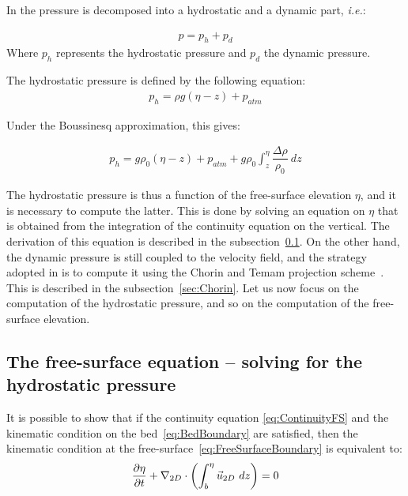 In  the pressure is decomposed into a hydrostatic and a dynamic part, \textit{i.e.}:

\begin{align}
  p=p_h+p_d
\end{align}
Where $p_h$ represents the hydrostatic pressure and $p_d$ the dynamic pressure.


The hydrostatic pressure is defined by the following equation:
\begin{align}
  p_h = \rho g (\eta-z) + p_{atm}
\end{align}

Under the Boussinesq approximation, this gives:

\begin{align}
  p_h  = g\rho_0(\eta-z) + p_{atm} + g\rho_0\int_z^\eta\dfrac{\Delta\rho}{\rho_0}~dz
\end{align}

The hydrostatic pressure is thus a function of the free-surface elevation $\eta$, and it is necessary to compute the latter.
This is done by solving an equation on $\eta$ that is obtained from the integration of the continuity equation on the vertical.
The derivation of this equation is described in the subsection~\ref{sec:FSequation}.
On the other hand, the dynamic pressure is still coupled to the velocity field, and the strategy adopted in 
is to compute it using the Chorin and Temam projection scheme~\cite{Chorin1968, Temam1968}.
This is described in the subsection~\ref{sec:Chorin}.
Let us now focus on the computation of the hydrostatic pressure, and so on the computation of the free-surface elevation.


\subsection{The free-surface equation -- solving for the hydrostatic pressure}\label{sec:FSequation}

It is possible to show that if the continuity equation \eqref{eq:ContinuityFS} and the kinematic condition on the bed~\eqref{eq:BedBoundary} are satisfied,
then the kinematic condition at the free-surface~\eqref{eq:FreeSurfaceBoundary} is equivalent to:
\begin{align}
  \dfrac{\partial \eta}{\partial t} + \nabla_{2D} \cdot\left(\int_{b}^{\eta}\vec{u}_{2D}~dz\right) = 0
  \label{eq:FS_eq0}
\end{align}


